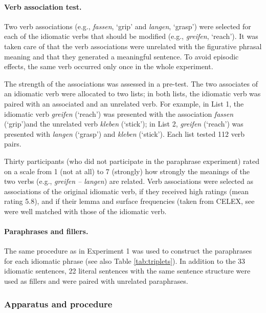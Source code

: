\paragraph{Verb association test.} 
Two verb associations (e.g., \textit{fassen}, ‘grip’ and \textit{langen}, ‘grasp’) were selected for each of the idiomatic verbs that should be modified (e.g., \textit{greifen}, ‘reach’). It was taken care of that the verb associations were unrelated with the figurative phrasal meaning and that they generated a meaningful sentence. To avoid episodic effects, the same verb occurred only once in the whole experiment. 

The strength of the associations was assessed in a pre-test. The two associates of an idiomatic verb were allocated to two lists; in both lists, the idiomatic verb was paired with an associated and an unrelated verb.  For example, in List 1, the idiomatic verb \textit{greifen} (‘reach’) was presented with the association \textit{fassen} (‘grip’)and the unrelated verb \textit{kleben} (‘stick’); in List 2, \textit{greifen} (‘reach’) was presented with \textit{langen} (‘grasp’) and \textit{kleben} (‘stick’). Each list tested 112 verb pairs. 

Thirty participants (who did not participate in the paraphrase experiment) rated on a scale from 1 (not at all) to 7 (strongly) how strongly the meanings of the two verbs (e.g., \textit{greifen – langen}) are related. Verb associations were selected as associations of the original idiomatic verb, if they received high ratings (mean rating 5.8), and if their lemma and surface frequencies (taken from CELEX, see \citep{baayen:1993} were well matched with those of the idiomatic verb. 

\paragraph{Paraphrases and fillers.} The same procedure as in Experiment 1 was used to construct the paraphrases for each idiomatic phrase (see also Table \ref{tab:triplets}). In addition to the 33 idiomatic sentences, 22 literal sentences with the same sentence structure were used as fillers and were paired with unrelated paraphrases. 

\subsubsection{Apparatus and procedure}


